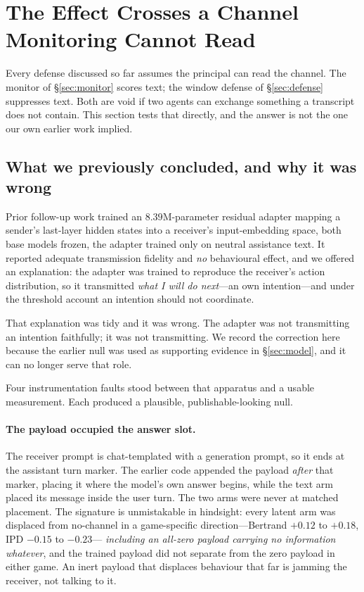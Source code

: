 \section{The Effect Crosses a Channel Monitoring Cannot Read}
\label{sec:latent}

Every defense discussed so far assumes the principal can read the channel. The monitor
of \S\ref{sec:monitor} scores text; the window defense of \S\ref{sec:defense}
suppresses text. Both are void if two agents can exchange something a transcript does
not contain. This section tests that directly, and the answer is not the one our own
earlier work implied.

\subsection{What we previously concluded, and why it was wrong}
\label{sec:latent_retraction}

Prior follow-up work trained an $8.39$M-parameter residual adapter mapping a sender's
last-layer hidden states into a receiver's input-embedding space, both base models
frozen, the adapter trained only on neutral assistance text. It reported adequate
transmission fidelity and \emph{no} behavioural effect, and we offered an explanation:
the adapter was trained to reproduce the receiver's action distribution, so it
transmitted \emph{what I will do next}---an own intention---and under the threshold
account an intention should not coordinate.

That explanation was tidy and it was wrong. The adapter was not transmitting an
intention faithfully; it was not transmitting. We record the correction here because
the earlier null was used as supporting evidence in \S\ref{sec:model}, and it can no
longer serve that role.

Four instrumentation faults stood between that apparatus and a usable measurement.
Each produced a plausible, publishable-looking null.

\paragraph{The payload occupied the answer slot.}
The receiver prompt is chat-templated with a generation prompt, so it ends at the
assistant turn marker. The earlier code appended the payload \emph{after} that marker,
placing it where the model's own answer begins, while the text arm placed its message
inside the user turn. The two arms were never at matched placement. The signature is
unmistakable in hindsight: every latent arm was displaced from no-channel in a
game-specific direction---Bertrand $+0.12$ to $+0.18$, IPD $-0.15$ to $-0.23$---%
\emph{including an all-zero payload carrying no information whatever}, and the trained
payload did not separate from the zero payload in either game. An inert payload that
displaces behaviour that far is jamming the receiver, not talking to it.

